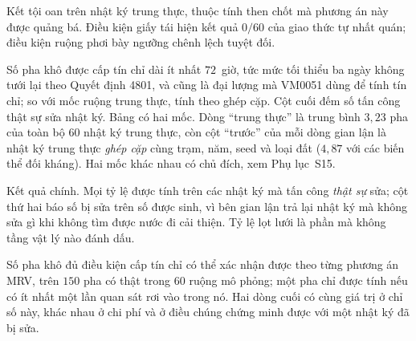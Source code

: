 \begin{table}[!t]
\centering
\caption{Kết tội oan trên nhật ký trung thực, thuộc tính then chốt mà phương án này
được quảng bá. Điều kiện giấy tái hiện kết quả $0/60$ của giao thức tự nhất quán;
điều kiện ruộng phơi bày ngưỡng chênh lệch tuyệt đối.}
\label{tab:falseacc}
\footnotesize

\end{table}

\begin{table}[!t]
\centering
\caption{Số pha khô được cấp tín chỉ dài ít nhất $72$~giờ, tức mức tối thiểu ba ngày không tưới lại theo Quyết định 4801, và cũng là đại lượng mà VM0051 dùng để tính tín chỉ; so với mốc ruộng trung thực, tính theo ghép cặp. Cột cuối đếm số tấn công thật sự sửa nhật ký. Bảng có hai mốc. Dòng ``trung
thực'' là trung bình $3{,}23$ pha của toàn bộ $60$ nhật ký trung thực, còn cột
``trước'' của mỗi dòng gian lận là nhật ký trung thực \emph{ghép cặp} cùng trạm,
năm, seed và loại đất ($4{,}87$ với các biến thể đối kháng). Hai mốc khác nhau
có chủ đích, xem Phụ lục~S15.}
\label{tab:credit}
\footnotesize

\end{table}

\begin{table}[!t]
\centering
\caption{Kết quả chính. Mọi tỷ lệ được tính trên các nhật ký mà tấn công
\emph{thật sự} sửa; cột thứ hai báo số bị sửa trên số được sinh, vì bên gian lận trả lại nhật ký mà không sửa gì khi không tìm được nước đi cải thiện. Tỷ lệ lọt lưới là
phần mà không tầng vật lý nào đánh dấu.}
\label{tab:defence}
\footnotesize

\end{table}

\begin{table}[!t]
\centering
\caption{Số pha khô đủ điều kiện cấp tín chỉ có thể xác nhận được theo từng
phương án MRV, trên $150$ pha có thật trong $60$ ruộng mô phỏng; một pha chỉ
được tính nếu có ít nhất một lần quan sát rơi vào trong nó. Hai dòng cuối có cùng giá trị ở chỉ số này, khác nhau ở chi phí và ở điều chúng chứng
minh được với một nhật ký đã bị sửa.}
\label{tab:benchmark}
\footnotesize

\end{table}




